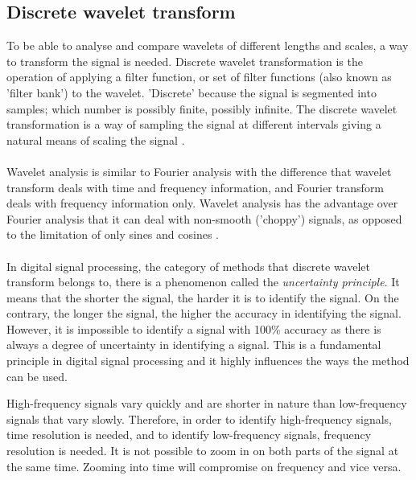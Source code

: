 \subsection{Discrete wavelet transform}
To be able to analyse and compare wavelets of different lengths and scales, a
way to transform the signal is needed. Discrete wavelet transformation is the
operation of applying a filter function, or set of filter functions (also known
as 'filter bank') to the wavelet. 'Discrete' because the signal is segmented
into samples; which number is possibly finite, possibly infinite. The
discrete wavelet transformation is a way of sampling the signal at different
intervals giving a natural means of scaling the signal \cite{karus2013}.

\paragraph{}
Wavelet analysis is similar to Fourier analysis with the difference that
wavelet transform deals with time and frequency information, and Fourier
transform deals with frequency information only. Wavelet analysis has the
advantage over Fourier analysis that it can deal with non-smooth ('choppy')
signals, as opposed to the limitation of only sines and cosines \cite{graps}.

\paragraph{}
In digital signal processing, the category of methods that discrete wavelet
transform belongs to, there is a phenomenon called the \emph{uncertainty
principle}\rm. It means that the shorter the signal, the harder it is to
identify the signal. On the contrary, the longer the signal, the higher the
accuracy in identifying the signal. However, it is impossible to identify a
signal with 100\% accuracy as there is always a degree of uncertainty in
identifying a signal. This is a fundamental principle in digital signal
processing and it highly influences the ways the method can be used.

High-frequency signals vary quickly and are shorter in nature than
low-frequency signals that vary slowly. Therefore, in order to identify
high-frequency signals, time resolution is needed, and to identify
low-frequency signals, frequency resolution is needed. It is not possible to
zoom in on both parts of the signal at the same time. Zooming into time will
compromise on frequency and vice versa.

